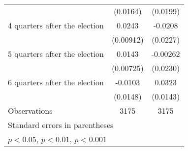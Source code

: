\begin{table}[htbp]
\begin{tabular}{l*{2}{c}}
                    &    (0.0164)         &    (0.0199)         \\
[1em]
 4 quarters after the election&      0.0243\sym{**} &     -0.0208         \\
                    &   (0.00912)         &    (0.0227)         \\
[1em]
 5 quarters after the election&      0.0143\sym{*}  &    -0.00262         \\
                    &   (0.00725)         &    (0.0230)         \\
[1em]
 6 quarters after the election&     -0.0103         &      0.0323\sym{*}  \\
                    &    (0.0148)         &    (0.0143)         \\
\hline
Observations        &        3175         &        3175         \\
\hline\hline
\multicolumn{3}{l}{\footnotesize Standard errors in parentheses}\\
\multicolumn{3}{l}{\footnotesize \sym{*} \(p<0.05\), \sym{**} \(p<0.01\), \sym{***} \(p<0.001\)}\\
\end{tabular}
\end{table}

